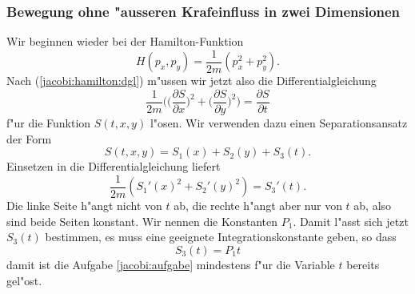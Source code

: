\subsubsection{Bewegung ohne "ausseren Krafeinfluss in zwei Dimensionen}
Wir beginnen wieder bei der Hamilton-Funktion 
\[
H(p_x, p_y)=\frac1{2m}(p_x^2+p_y^2).
\]
Nach (\ref{jacobi:hamilton:dgl}) m"ussen wir jetzt also die
Differentialgleichung
\[
\frac1{2m}\biggl(
\biggl(\frac{\partial S}{\partial x}\biggr)^2
+
\biggl(\frac{\partial S}{\partial y}\biggr)^2
\biggr)=\frac{\partial S}{\partial t}
\]
f"ur die Funktion $S(t,x,y)$ l"osen. Wir verwenden dazu einen 
Separationsansatz der Form
\[
S(t,x,y)=S_1(x)+S_2(y) + S_3(t).
\]
Einsetzen in die Differentialgleichung liefert
\begin{equation}
\frac1{2m}( S_1'(x)^2+S_2'(y)^2)=S_3'(t).
\label{jacobi:kraeftefrei:sep1}
\end{equation}
Die linke Seite h"angt nicht von $t$ ab, die rechte h"angt
aber nur von $t$ ab, also sind beide Seiten konstant.
Wir nennen die Konstanten $P_1$. Damit l"asst sich
jetzt $S_3(t)$ bestimmen, es muss eine geeignete Integrationskonstante
geben, so dass
\[
S_3(t)=P_1t
\]
damit ist die Aufgabe \ref{jacobi:aufgabe} mindestens f"ur die Variable
$t$ bereits gel"ost.

